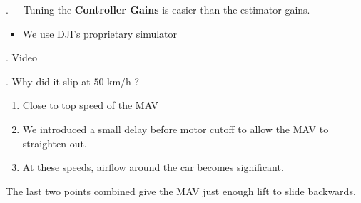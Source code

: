 
\begin{frame}{\thesection. \insertsection \ - \insertsubsection}
	Tuning the \textbf{Controller Gains} is easier than the estimator gains.
	\begin{itemize}
		\item We use DJI's proprietary simulator 
	\end{itemize}
\end{frame}


\begin{frame}{\thesection. \insertsection}
	Video
\end{frame}


\begin{frame}{\thesection. \insertsection}	
	Why did it slip at $50$ km/h ?
	\begin{enumerate}
		\item Close to top speed of the MAV 
		\item We introduced a small delay before motor cutoff to allow the MAV to straighten out.
		\item At these speeds, airflow around the car becomes significant.
	\end{enumerate}
	The last two points combined give the MAV just enough lift to slide backwards.
\end{frame}
